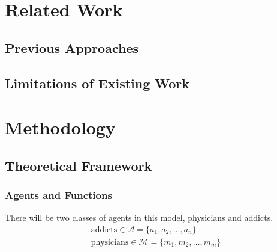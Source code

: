\documentclass[11pt,a4paper]{article}
\begin{document}

\section{Related Work}
\label{sec:related_work}


\subsection{Previous Approaches}
\label{subsec:previous_approaches}


\subsection{Limitations of Existing Work}
\label{subsec:limitations}


\section{Methodology}
\label{sec:methodology}

\subsection{Theoretical Framework}
\label{subsec:framework}

\subsubsection*{Agents and Functions}
\label{subsubsec:agents&functions}
There will be two classes of agents in this model, physicians and addicts. 
\begin{gather*}
  \text{addicts} \in \mathcal{A} = \{a_1, a_2, \ldots, a_n\} \\
  \text{physicians} \in \mathcal{M} = \{m_1, m_2, \ldots, m_m\}
\end{gather*}
\end{document}
